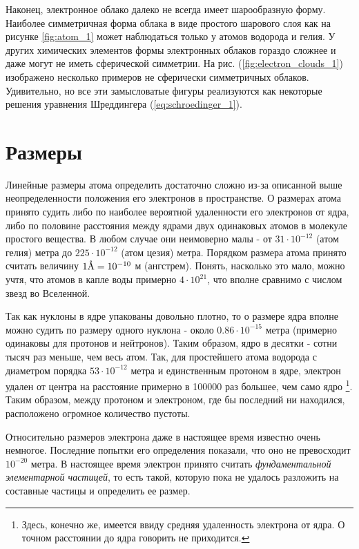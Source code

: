 Наконец, электронное облако далеко не всегда имеет шарообразную форму.
Наиболее симметричная форма облака в виде простого шарового слоя как на рисунке \ref{fig:atom_1} может наблюдаться только у атомов водорода и гелия.
У других химических элементов формы электронных облаков гораздо сложнее и даже могут не иметь сферической симметрии.
На рис. (\ref{fig:electron_clouds_1}) изображено несколько примеров не сферически симметричных облаков.
Удивительно, но все эти замысловатые фигуры реализуются как некоторые решения уравнения Шреддингера (\ref{eq:schroedinger_1}).


\section*{Размеры}

Линейные размеры атома определить достаточно сложно из-за описанной выше неопределенности положения его электронов в пространстве.
О размерах атома принято судить либо по наиболее вероятной удаленности его электронов от ядра, либо по половине расстояния между ядрами двух одинаковых атомов в молекуле простого вещества.
В любом случае они неимоверно малы - от $31\cdot 10^{-12}$ (атом гелия) метра до $225\cdot 10^{-12}$ (атом цезия) метра.
Порядком размера атома принято считать величину $1\mbox{\normalfont\AA} = 10^{-10}$ м (ангстрем).
Понять, насколько это мало, можно учтя, что атомов в капле воды примерно $4\cdot 10^{21}$, что вполне сравнимо с числом звезд во Вселенной.

Так как нуклоны в ядре упакованы довольно плотно, то о размере ядра вполне можно судить по размеру одного нуклона - около $0.86\cdot 10^{-15}$ метра (примерно одинаковы для протонов и нейтронов). 
Таким образом, ядро в десятки - сотни тысяч раз меньше, чем весь атом.
Так, для простейшего атома водорода с диаметром порядка $53\cdot 10^{-12}$ метра и единственным протоном в ядре, электрон удален от центра на расстояние примерно в 100000 раз большее, чем само ядро \footnote{%
    Здесь, конечно же, имеется ввиду средняя удаленность электрона от ядра.
    О точном расстоянии до ядра говорить не приходится.}.
Таким образом, между протоном и электроном, где бы последний ни находился, расположено огромное количество пустоты.

Относительно размеров электрона даже в настоящее время известно очень немногое.
Последние попытки его определения показали, что оно не превосходит $10^{-20}$ метра.
В настоящее время электрон принято считать \textit{фундаментальной элементарной частицей}, то есть такой, которую пока не удалось разложить на составные частицы и определить ее размер.

